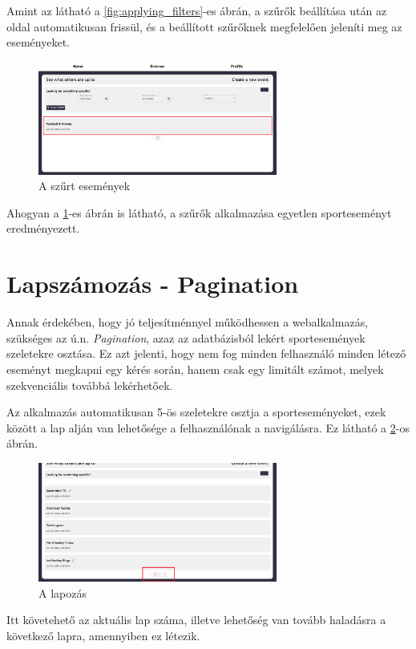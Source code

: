 Amint az látható a \ref{fig:applying_filters}-es ábrán, a szűrők beállítása után az oldal automatikusan frissül, és a beállított szűrőknek megfelelően
jeleníti meg az eseményeket. 

\begin{figure}
	\centering
	\includegraphics[width=0.7\textwidth]{images/filtering_events_5.png}
	\caption{A szűrt események}
	\label{fig:filtered_events}
\end{figure}

Ahogyan a \ref{fig:filtered_events}-es ábrán is látható, a szűrők alkalmazása egyetlen sporteseményt eredményezett.

\newpage
\section{Lapszámozás - Pagination}

Annak érdekében, hogy jó teljesítménnyel működhessen a webalkalmazás, szükséges az ú.n. \textit{Pagination}\cite{paginationdocs}, azaz az adatbázisból lekért sportesemények
szeletekre osztása. Ez azt jelenti, hogy nem fog minden felhasználó minden létező eseményt megkapni egy kérés során, hanem csak egy limitált számot,
melyek szekvenciális továbbá lekérhetőek.

Az alkalmazás automatikusan 5-ös szeletekre osztja a sporteseményeket, ezek között a lap alján van lehetősége a felhasználónak a navigálásra. Ez látható a \ref{fig:pagination}-os ábrán.

\begin{figure}[ht]
	\centering
	\includegraphics[width=0.7\textwidth]{images/pagination_1.png}
	\caption{A lapozás}
	\label{fig:pagination}
\end{figure}

Itt követehető az aktuális lap száma, illetve lehetőség van tovább haladásra a következő lapra, amennyiben ez létezik.
